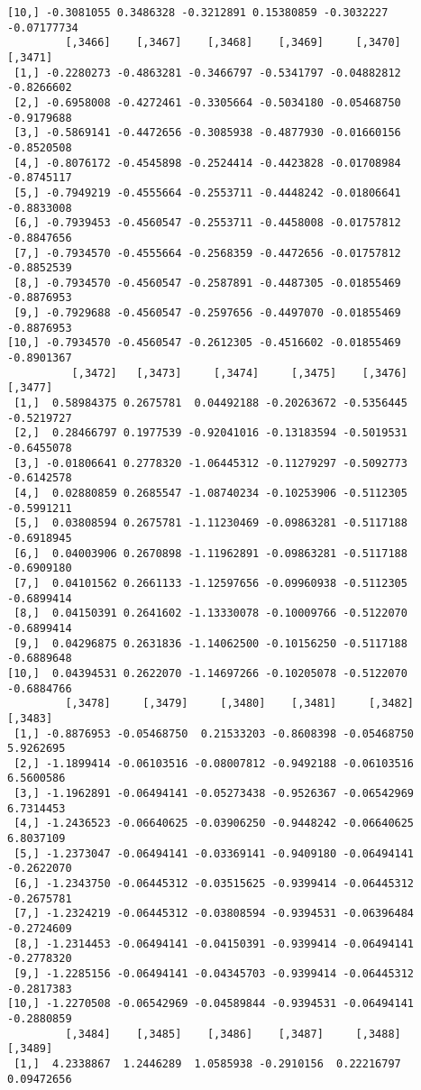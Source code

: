 \documentclass[
  letterpaper,
  DIV=11,
  numbers=noendperiod]{scrreprt}
\begin{document}
\begin{verbatim}
[10,] -0.3081055 0.3486328 -0.3212891 0.15380859 -0.3032227 -0.07177734
         [,3466]    [,3467]    [,3468]    [,3469]     [,3470]    [,3471]
 [1,] -0.2280273 -0.4863281 -0.3466797 -0.5341797 -0.04882812 -0.8266602
 [2,] -0.6958008 -0.4272461 -0.3305664 -0.5034180 -0.05468750 -0.9179688
 [3,] -0.5869141 -0.4472656 -0.3085938 -0.4877930 -0.01660156 -0.8520508
 [4,] -0.8076172 -0.4545898 -0.2524414 -0.4423828 -0.01708984 -0.8745117
 [5,] -0.7949219 -0.4555664 -0.2553711 -0.4448242 -0.01806641 -0.8833008
 [6,] -0.7939453 -0.4560547 -0.2553711 -0.4458008 -0.01757812 -0.8847656
 [7,] -0.7934570 -0.4555664 -0.2568359 -0.4472656 -0.01757812 -0.8852539
 [8,] -0.7934570 -0.4560547 -0.2587891 -0.4487305 -0.01855469 -0.8876953
 [9,] -0.7929688 -0.4560547 -0.2597656 -0.4497070 -0.01855469 -0.8876953
[10,] -0.7934570 -0.4560547 -0.2612305 -0.4516602 -0.01855469 -0.8901367
          [,3472]   [,3473]     [,3474]     [,3475]    [,3476]    [,3477]
 [1,]  0.58984375 0.2675781  0.04492188 -0.20263672 -0.5356445 -0.5219727
 [2,]  0.28466797 0.1977539 -0.92041016 -0.13183594 -0.5019531 -0.6455078
 [3,] -0.01806641 0.2778320 -1.06445312 -0.11279297 -0.5092773 -0.6142578
 [4,]  0.02880859 0.2685547 -1.08740234 -0.10253906 -0.5112305 -0.5991211
 [5,]  0.03808594 0.2675781 -1.11230469 -0.09863281 -0.5117188 -0.6918945
 [6,]  0.04003906 0.2670898 -1.11962891 -0.09863281 -0.5117188 -0.6909180
 [7,]  0.04101562 0.2661133 -1.12597656 -0.09960938 -0.5112305 -0.6899414
 [8,]  0.04150391 0.2641602 -1.13330078 -0.10009766 -0.5122070 -0.6899414
 [9,]  0.04296875 0.2631836 -1.14062500 -0.10156250 -0.5117188 -0.6889648
[10,]  0.04394531 0.2622070 -1.14697266 -0.10205078 -0.5122070 -0.6884766
         [,3478]     [,3479]     [,3480]    [,3481]     [,3482]    [,3483]
 [1,] -0.8876953 -0.05468750  0.21533203 -0.8608398 -0.05468750  5.9262695
 [2,] -1.1899414 -0.06103516 -0.08007812 -0.9492188 -0.06103516  6.5600586
 [3,] -1.1962891 -0.06494141 -0.05273438 -0.9526367 -0.06542969  6.7314453
 [4,] -1.2436523 -0.06640625 -0.03906250 -0.9448242 -0.06640625  6.8037109
 [5,] -1.2373047 -0.06494141 -0.03369141 -0.9409180 -0.06494141 -0.2622070
 [6,] -1.2343750 -0.06445312 -0.03515625 -0.9399414 -0.06445312 -0.2675781
 [7,] -1.2324219 -0.06445312 -0.03808594 -0.9394531 -0.06396484 -0.2724609
 [8,] -1.2314453 -0.06494141 -0.04150391 -0.9399414 -0.06494141 -0.2778320
 [9,] -1.2285156 -0.06494141 -0.04345703 -0.9399414 -0.06445312 -0.2817383
[10,] -1.2270508 -0.06542969 -0.04589844 -0.9394531 -0.06494141 -0.2880859
         [,3484]    [,3485]    [,3486]    [,3487]     [,3488]    [,3489]
 [1,]  4.2338867  1.2446289  1.0585938 -0.2910156  0.22216797 0.09472656

\end{verbatim}
\end{document}
